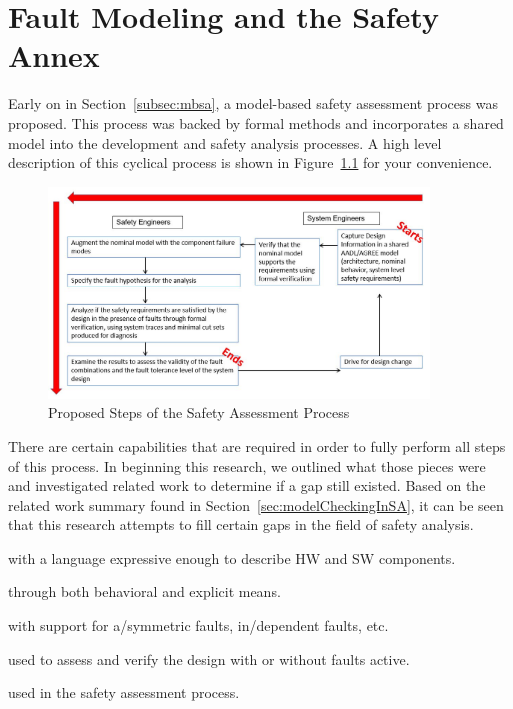 \chapter{Fault Modeling and the Safety Annex}
\label{chap:faultModeling}
Early on in Section~\ref{subsec:mbsa}, a model-based safety assessment process was proposed. This process was backed by formal methods and incorporates a shared model into the development and safety analysis processes. A high level description of this cyclical process is shown in Figure~\ref{fig:SACycle} for your convenience. 

\begin{figure}[h]
	\begin{center}
		\includegraphics[width=0.9\textwidth]{images/process4.jpg}
	\end{center}
	\caption{Proposed Steps of the Safety Assessment Process}
	\label{fig:SACycle}
\end{figure}

There are certain capabilities that are required in order to fully perform all steps of this process. In beginning this research, we outlined what those pieces were and investigated related work to determine if a gap still existed. Based on the related work summary found in Section~\ref{sec:modelCheckingInSA}, it can be seen that this research attempts to fill certain gaps in the field of safety analysis. 

\begin{description}[nosep]

    \item[Shared model] with a language expressive enough to describe HW and SW components.
    \item[Flexible error propagations] through both behavioral and explicit means.
    \item[Flexible fault modeling] with support for a/symmetric faults, in/dependent faults, etc.
    \item[Model checker] used to assess and verify the design with or without faults active.
    \item[Ability to generate artifacts] used in the safety assessment process.
\end{description}

